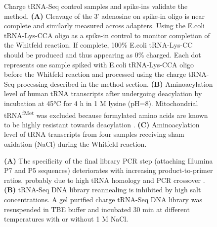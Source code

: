 \begin{figure}[ht]
    \centering
    \caption[Sequenced controls.]{
    Charge tRNA-Seq control samples and spike-ins validate the method.
    \textbf{(A)} Cleavage of the 3′ adenosine on spike-in oligo is near complete and similarly measured across adapters.
    Using the E.coli tRNA-Lys-CCA oligo as a spike-in control to monitor completion of the Whitfeld reaction.
    If complete, 100\% E.coli tRNA-Lys-CC should be produced and thus appearing as 0\% charged.
    Each dot represents one sample spiked with E.coli tRNA-Lys-CCA oligo before the Whitfeld reaction and processed using the charge tRNA-Seq processing described in the method section.
    \textbf{(B)} Aminoacylation level of human tRNA transcripts after undergoing deacylation by incubation at 45°C for 4 h in 1 M lysine (pH=8).
    Mitochondrial tRNA\textsuperscript{fMet} was excluded because formylated amino acids are known to be highly resistant towards deacylation \cite{Schofield1968-qn}.
    \textbf{(C)} Aminoacylation level of tRNA transcripts from four samples receiving sham oxidation (NaCl) during the Whitfeld reaction.
    }
    \label{ch5:figsupp:f2S7}
\end{figure}


\begin{figure}[ht]
    \centering
    \caption[tRNA homology requires careful PCR conditions.]{
    \textbf{(A)} The specificity of the final library PCR step (attaching Illumina P7 and P5 sequences) deteriorates with increasing product-to-primer ratios, probably due to high tRNA homology and PCR crossover \cite{Holcomb2014-vz}.
    \textbf{(B)} tRNA-Seq DNA library reannealing is inhibited by high salt concentrations.
    A gel purified charge tRNA-Seq DNA library was resuspended in TBE buffer and incubated 30 min at different temperatures with or without 1 M NaCl.
    }
    \label{ch5:figsupp:f2S8}
\end{figure}


